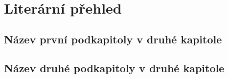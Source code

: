 \chapter{Literární přehled}

\section{Název první podkapitoly v druhé kapitole}

\section{Název druhé podkapitoly v druhé kapitole}

